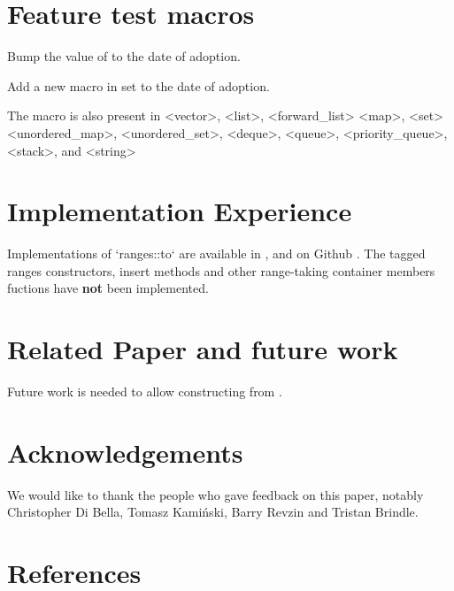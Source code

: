 \documentclass{wg21}
\begin{document}
\section{Feature test macros}

Bump the value of  to the date of adoption.

Add a new macro in   set to the date of adoption.

The macro  is also present in
<vector>, <list>, <forward_list> <map>, <set> <unordered_map>, <unordered_set>, <deque>, <queue>, <priority_queue>, <stack>, and <string>


\section{Implementation Experience}

Implementations of `ranges::to` are available in \cite{Range V3}, \cite{cmcstl2} and on Github \cite{rangesnext}.
The tagged ranges constructors, insert methods and other range-taking container members fuctions have \textbf{not} been
implemented.

\section{Related Paper and future work}

Future work is needed to allow constructing  from .

\section{Acknowledgements}
We would like to thank the people who gave feedback on this paper, notably Christopher Di Bella, Tomasz Kamiński, Barry Revzin
and Tristan Brindle.\\

\section{References}
\renewcommand{\section}[2]{}%

\end{document}

